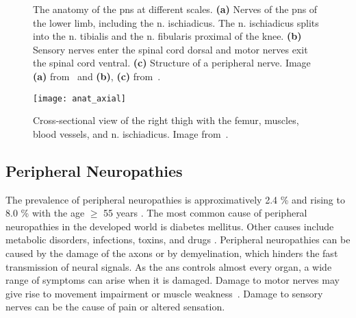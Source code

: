 \begin{figure}[htbp]
    \begin{minipage}[c][0.9\textheight][t]{.5\textwidth}
        \centering
        \vspace*{\fill}
    \end{minipage}
    \begin{minipage}[c][0.9\textheight][t]{.5\textwidth}
        \centering
        \vspace*{\fill}
        \vfill
    \end{minipage}
    \vspace*{-0.3cm}
    \caption[Anatomy of the Peripheral Nervous System]{The anatomy of the \gls{pns} at different scales. \textbf{(a)} Nerves of the \gls{pns} of the lower limb, including the \gls{n.} ischiadicus. The \gls{n.} ischiadicus splits into the \gls{n.} tibialis and the \gls{n.} fibularis proximal of the knee.  \textbf{(b)} Sensory nerves enter the spinal cord dorsal and motor nerves exit the spinal cord ventral. \textbf{(c)} Structure of a peripheral nerve. Image \textbf{(a)} from~\cite{Schunke2014PrometheusAnatomie} and \textbf{(b)}, \textbf{(c)} from~\cite{Schunke2015THIEMEAnatomy}.}
    \label{fig:anat}
\end{figure}

\begin{figure}[htbp]
	\texttt{[image: anat\_axial]}
    \caption[Cross-section of the Right Thigh]{Cross-sectional view of the right thigh with the femur, muscles, blood vessels, and \gls{n.} ischiadicus. Image from~\cite{Schunke2014PrometheusAnatomie}.}
    \label{fig:anat_axial}
\end{figure}

\subsection{Peripheral Neuropathies}
The prevalence of peripheral neuropathies is approximatively 2.4 \% and rising to 8.0 \% with the age $\geq$ 55 years \cite{Martyn1997EpidemiologyNeuropathy}. The most common cause of peripheral neuropathies in the developed world is diabetes mellitus. Other causes include metabolic disorders, infections, toxins, and drugs \cite{England2004PeripheralNeuropathy,Hughes466}.
Peripheral neuropathies can be caused by the damage of the axons or by demyelination, which hinders the fast transmission of neural signals. 
As the \gls{ans} controls almost every organ, a wide range of symptoms can arise when it is damaged. Damage to motor nerves may give rise to movement impairment or muscle weakness~\cite{Mohassel2015}. Damage to sensory nerves can be the cause of pain or altered sensation.

